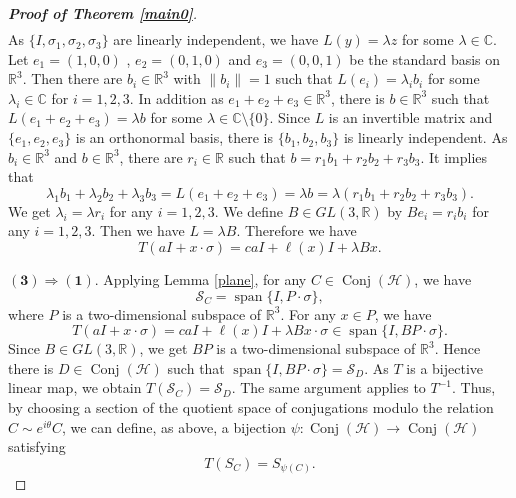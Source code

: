 \documentclass[10pt,a4paper]{amsart}
\newcommand{\Conj}{\operatorname{Conj}(\cH)}
\newcommand{\SC}{\mathcal{S}_C}
\newcommand{\Span}{\operatorname{span}}
\newcommand{\cH}{{\mathcal{H}}}
\begin{document}
\begin{proof}[{\textbf {Proof of Theorem \ref{main0}}}]
\begin{multline*}
\end{multline*}
As $\{I, \sigma_1, \sigma_2, \sigma_3\}$ are linearly independent,  we have $L(y)=\lambda z$ for some $\lambda \in \mathbb{C}$. Let $e_1=(1,0,0)$ , $e_2=(0,1,0)$ and $e_3=(0,0,1)$ be the standard basis on $\mathbb{R}^3$. Then there are $b_i \in \mathbb{R}^3$ with $\|b_i\|=1$ such that $L(e_i)=\lambda_i b_i$ for some $\lambda_i \in \mathbb{C}$ for $i=1,2,3$. 
In addition as $e_1+e_2+e_3 \in \mathbb{R}^3$, there is $b \in \mathbb{R}^3$ such that $L(e_1+e_2+e_3)=\lambda b$ for some $\lambda \in \mathbb{C}\setminus\{0\}$. Since $L$  is an invertible matrix and $\{e_1, e_2, e_3\}$  is an orthonormal basis, there is $\{b_1, b_2, b_3\}$ is linearly independent. As $b_i \in \mathbb{R}^3$ and $b \in \mathbb{R}^3$, there are $r_i \in \mathbb{R}$ such that $b=r_1b_1+r_2b_2+r_3b_3$. It implies that
\[
\lambda_1 b_1+\lambda_2 b_2+\lambda_3 b_3=L(e_1+e_2+e_3)=\lambda b= \lambda (r_1b_1+r_2b_2+r_3b_3).
\]
We get $\lambda_i=\lambda r_i$ for any $i=1,2,3$. We define $B \in GL(3,\mathbb{R})$ by $Be_i=r_ib_i$ for any $i=1,2,3$. Then we have $L=\lambda B$. Therefore we have
\[
T(aI+x\cdot \sigma)=c aI+\ell(x)I+\lambda Bx.
\] 

$\bm{(3) \Rightarrow (1)}.$
Applying Lemma \ref{plane}, for any $C \in \Conj$, we have 
\[
\SC=\Span\{I, P\cdot\sigma\},  
\]
where $P$ is a  two-dimensional subspace of $\mathbb{R}^3$. For any $x \in P$, we have
\[
T(aI+x \cdot \sigma)=c aI+\ell(x)I+\lambda Bx \cdot \sigma \in \Span\{ I, BP \cdot \sigma\}.
\]
Since $B \in GL(3, \mathbb{R})$, we get $BP$  is a  two-dimensional subspace of $\mathbb{R}^3$. Hence there is $D \in \Conj$ such that $\Span\{ I, BP \cdot \sigma\}=\mathcal{S}_D$. As $T$ is a bijective linear map, we obtain $T(\SC)=\mathcal{S}_D$. The same argument applies to $T^{-1}$. Thus, by choosing a section of the quotient space of conjugations modulo the relation $C\sim e^{i\theta}C$, we can define, as above, a bijection $\psi:\Conj \to \Conj$ satisfying
\[
T(S_C)=S_{\psi(C)}.
\]


\end{proof}
\end{document}
